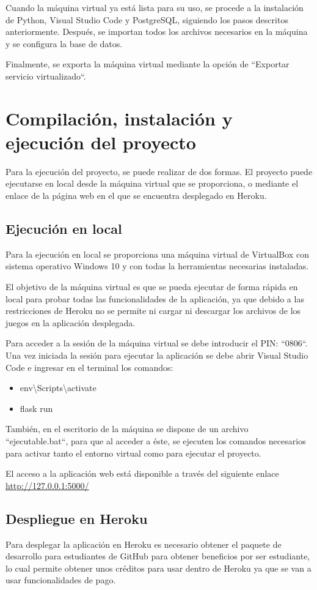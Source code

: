 Cuando la máquina virtual ya está lista para su uso, se procede a la instalación de Python, Visual Studio Code y PostgreSQL, siguiendo los pasos descritos anteriormente. Después, se importan todos los archivos necesarios en la máquina y se configura la base de datos.

Finalmente, se exporta la máquina virtual mediante la opción de ``Exportar servicio virtualizado``.

\section{Compilación, instalación y ejecución del proyecto}
Para la ejecución del proyecto, se puede realizar de dos formas.
El proyecto puede ejecutarse en local desde la máquina virtual que se proporciona, o mediante el enlace de la página web en el que se encuentra desplegado en Heroku.

\subsection{Ejecución en local}
Para la ejecución en local se proporciona una máquina virtual de VirtualBox con sistema operativo Windows 10 y con todas la herramientas necesarias instaladas.

El objetivo de la máquina virtual es que se pueda ejecutar de forma rápida en local para probar todas las funcionalidades de la aplicación, ya que debido a las restricciones de Heroku no se permite ni cargar ni descargar los archivos de los juegos en la aplicación desplegada.

Para acceder a la sesión de la máquina virtual se debe introducir el PIN: ``0806``.
Una vez iniciada la sesión para ejecutar la aplicación se debe abrir Visual Studio Code e ingresar en el terminal los comandos:
\begin{itemize}
    \item env\textbackslash Scripts\textbackslash activate
    \item flask run
\end{itemize}

También, en el escritorio de la máquina se dispone de un archivo ``ejecutable.bat``, para que al acceder a éste, se ejecuten los comandos necesarios para activar tanto el entorno virtual como para ejecutar el proyecto.

El acceso a la aplicación web está disponible a través del siguiente enlace \url{http://127.0.0.1:5000/}

\subsection{Despliegue en Heroku}
Para desplegar la aplicación en Heroku es necesario obtener el paquete de desarrollo para estudiantes de GitHub para obtener beneficios por ser estudiante, lo cual permite obtener unos créditos para usar dentro de Heroku ya que se van a usar funcionalidades de pago.

